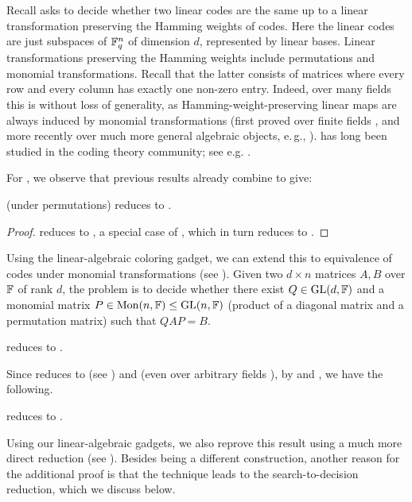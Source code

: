 Recall \CodeEqlong asks to decide whether two linear codes are the 
same up to a linear transformation preserving the Hamming weights of codes. Here 
the linear codes are just subspaces of $\mathbb{F}_q^n$ of dimension $d$, represented by 
linear bases. Linear transformations preserving the Hamming weights include 
permutations and monomial transformations. Recall that the latter consists of matrices 
where every row and every column has exactly one non-zero entry. 
Indeed, over many fields this is without loss of generality, as Hamming-weight-preserving 
linear maps are always induced by monomial transformations (first proved over 
finite fields \cite{MacWilliams}, and more recently over much more general 
algebraic objects, e.\,g., \cite{GNW}). 
\CodeEq has long 
been studied in the coding theory community; see e.g. \cite{PR97,Sen00}.

For \CodeEqlong, we observe that previous results already combine to give:
\begin{observation}\label{obs:code_3TI}
\CodeEqlong (under permutations) reduces to \ThreeTIlong.
\end{observation}

\begin{proof}
 \CodeEqlong reduces to \MatLieConjlong \cite{GrochowLie}, a special case of 
 \MatSpConjlong, which in turn reduces to \ThreeTI \cite{FGS19}.
\end{proof}

Using the linear-algebraic coloring gadget, we can extend this to equivalence of 
codes under monomial transformations (see ). Given two 
$d\times n$ matrices $A, B$ over $\mathbb{F}$ of rank $d$, the \MonCodeEqlong
problem is to decide whether there exist $Q\in \mathrm{GL}(d, \mathbb{F})$ and a monomial 
matrix $P\in \mathrm{Mon}(n, \mathbb{F})\leq \mathrm{GL}(n, \mathbb{F})$ 
(product of a diagonal matrix and a permutation matrix) such that $QAP =B$. 

\begin{proposition} \label{prop:MonCodeEq}
\MonCodeEqlong reduces to \ThreeTIlong.
\end{proposition}

Since \GIlong reduces to \CodeEqlong \cite{Luks} (see \cite{miyazakiCodeEq}) and \cite{PR97} (even over arbitrary fields \cite{GrochowLie}), by 
 and , we have the following.
\begin{corollary}
\GIlong reduces to \AltMatSpIsomlong.
\end{corollary}

Using our linear-algebraic gadgets, we also
reprove this result using a much more 
direct reduction (see ). Besides being a different 
construction, another reason for the additional proof is that the technique leads to the 
search-to-decision reduction, which we discuss below.

